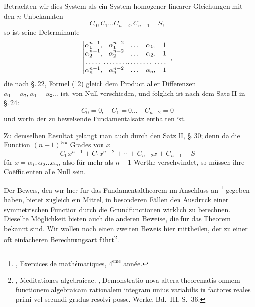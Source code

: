 Betrachten wir dies System als ein System homogener linearer Gleichungen mit den $n$ Unbekannten
\[
 C_0,C_1\ldots C_{n-2},C_{n-1}-S,
\]
so ist seine Determinante
\[
\begin{vmatrix}
 \alpha_1^{n-1},&\alpha_1^{n-2}&\ldots&\alpha_1,&1\\
 \alpha_2^{n-1},&\alpha_2^{n-2}&\ldots&\alpha_2,&1\\
 \multicolumn{5}{c}{\makebox[12em]{\dotfill}}\\
 \alpha_n^{n-1},&\alpha_n^{n-2}&\ldots&\alpha_n,&1
\end{vmatrix},
\]
die nach \S.\,22, Formel (12) gleich dem Product aller Differenzen $\alpha_1-\alpha_2,\alpha_1-\alpha_3\ldots$ ist, von Null verschieden, und folglich ist nach dem Satz II in \S.\,24:
\[
 C_0=0,\quad C_1=0\ldots\quad C_{n-2}=0
\]
und
worin der zu beweisende Fundamentalsatz enthalten ist.

Zu demselben Resultat gelangt man auch durch den Satz II, \S.\,30; denn da die Function $(n-1)^{\text{ten}}$ Grades von $x$
\[
 C_0x^{n-1}+C_1x^{n-2}+\cdots+C_{n-2}x+C_{n-1}-S
\]
für $x=\alpha_1,\alpha_2\ldots\alpha_n$, also für mehr als $n-1$ Werthe verschwindet, so müssen ihre Coëfficienten alle Null sein.

Der Beweis, den wir hier für das Fundamentaltheorem im Anschluss an \footnote[1]{, Exercices de mathématiques, $4^{\text{ème}}$ année.} gegeben haben, bietet zugleich ein Mittel, in besonderen Fällen den Ausdruck einer symmetrischen Function durch die Grundfunctionen wirklich zu berechnen. Dieselbe Möglichkeit bieten auch die anderen Beweise, die für das Theorem bekannt sind. Wir wollen noch einen zweiten Beweis hier mittheilen, der zu einer oft einfacheren Berechnungsart führt\footnote[2]{, Meditationes algebraicae. , Demonstratio nova altera theorematis omnem functionem algebraicam rationalem integram unius variabilis in factores reales primi vel secundi gradus resolvi posse. Werke, Bd.\ III, S.\ 36.}.
